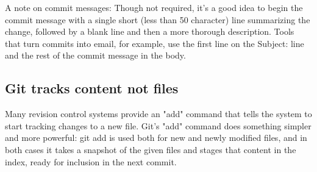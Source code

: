 A note on commit messages: Though not required, it's a good idea to begin the
commit message with a single short (less than 50 character) line summarizing
the change, followed by a blank line and then a more thorough description.
Tools that turn commits into email, for example, use the first line on the
Subject: line and the rest of the commit message in the body.

\subsection{Git tracks content not files}
Many revision control systems provide an "add" command that tells the system to
start tracking changes to a new file. Git's "add" command does something
simpler and more powerful: git add is used both for new and newly modified
files, and in both cases it takes a snapshot of the given files and stages that
content in the index, ready for inclusion in the next commit.
